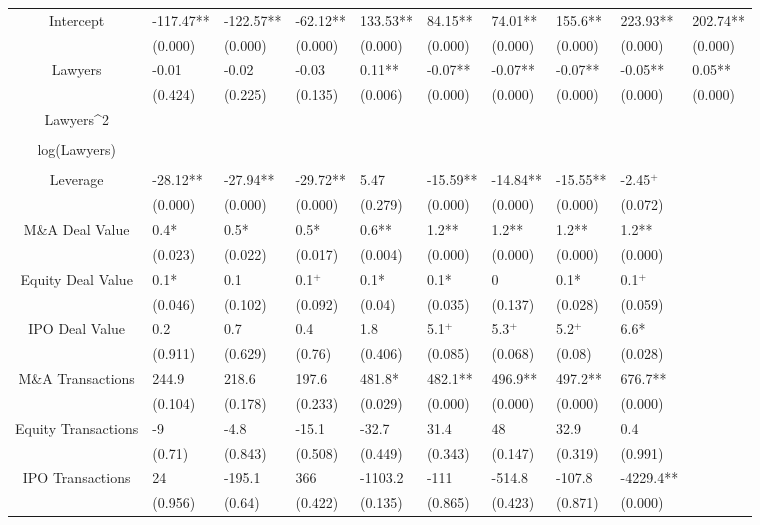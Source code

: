 \documentclass{article}
\begin{document}
\begin{table}[H]
\begin{tabular}{|clllllllll|}
Intercept & -117.47** & -122.57** & -62.12** & 133.53** & 84.15** & 74.01** & 155.6** & 223.93** & 202.74** \\ 
   & (0.000) & (0.000) & (0.000) & (0.000) & (0.000) & (0.000) & (0.000) & (0.000) & (0.000) \\ 
  Lawyers & -0.01 & -0.02 & -0.03 & 0.11** & -0.07** & -0.07** & -0.07** & -0.05** & 0.05** \\ 
   & (0.424) & (0.225) & (0.135) & (0.006) & (0.000) & (0.000) & (0.000) & (0.000) & (0.000) \\ 
  Lawyers^2 &  &  &  &  &  &  &  &  &  \\ 
   &  &  &  &  &  &  &  &  &  \\ 
  log(Lawyers) &  &  &  &  &  &  &  &  &  \\ 
   &  &  &  &  &  &  &  &  &  \\ 
  Leverage & -28.12** & -27.94** & -29.72** & 5.47 & -15.59** & -14.84** & -15.55** & -2.45$^{+}$ &  \\ 
   & (0.000) & (0.000) & (0.000) & (0.279) & (0.000) & (0.000) & (0.000) & (0.072) &  \\ 
  M\&A Deal Value & 0.4* & 0.5* & 0.5* & 0.6** & 1.2** & 1.2** & 1.2** & 1.2** &  \\ 
   & (0.023) & (0.022) & (0.017) & (0.004) & (0.000) & (0.000) & (0.000) & (0.000) &  \\ 
  Equity Deal Value & 0.1* & 0.1 & 0.1$^{+}$ & 0.1* & 0.1* & 0 & 0.1* & 0.1$^{+}$ &  \\ 
   & (0.046) & (0.102) & (0.092) & (0.04) & (0.035) & (0.137) & (0.028) & (0.059) &  \\ 
  IPO Deal Value & 0.2 & 0.7 & 0.4 & 1.8 & 5.1$^{+}$ & 5.3$^{+}$ & 5.2$^{+}$ & 6.6* &  \\ 
   & (0.911) & (0.629) & (0.76) & (0.406) & (0.085) & (0.068) & (0.08) & (0.028) &  \\ 
  M\&A Transactions & 244.9 & 218.6 & 197.6 & 481.8* & 482.1** & 496.9** & 497.2** & 676.7** &  \\ 
   & (0.104) & (0.178) & (0.233) & (0.029) & (0.000) & (0.000) & (0.000) & (0.000) &  \\ 
  Equity Transactions & -9 & -4.8 & -15.1 & -32.7 & 31.4 & 48 & 32.9 & 0.4 &  \\ 
   & (0.71) & (0.843) & (0.508) & (0.449) & (0.343) & (0.147) & (0.319) & (0.991) &  \\ 
  IPO Transactions & 24 & -195.1 & 366 & -1103.2 & -111 & -514.8 & -107.8 & -4229.4** &  \\ 
   & (0.956) & (0.64) & (0.422) & (0.135) & (0.865) & (0.423) & (0.871) & (0.000) &  \\ 

\end{tabular}
\end{table}
\end{document}
